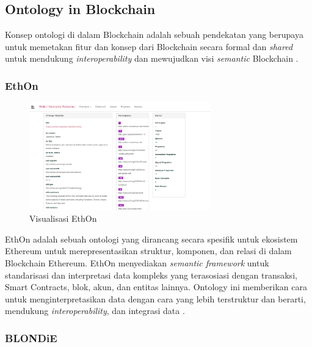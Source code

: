 \subsection{Ontology in Blockchain}
\label{subsec:ontology-in-blockchain}

Konsep ontologi di dalam Blockchain adalah sebuah pendekatan yang berupaya untuk memetakan fitur dan konsep dari Blockchain secara formal dan \textit{shared} untuk mendukung \textit{interoperability} \parencite{9770809} dan mewujudkan visi \textit{semantic} Blockchain \parencite{hector2020blondie}. 

\subsubsection{EthOn}
\label{subsubsec:ethon}

\begin{figure}[ht]
  \centering
  \includegraphics[width=0.7\textwidth]{resources/chapter-2/ethon.png}
  \caption{Visualisasi EthOn \parencite{ethon2024}}
  \label{image:ethon}
\end{figure}

EthOn adalah sebuah ontologi yang dirancang secara spesifik untuk ekosistem Ethereum untuk merepresentasikan struktur, komponen, dan relasi di dalam Blockchain Ethereum. EthOn menyediakan \textit{semantic framework} untuk standarisasi dan interpretasi data kompleks yang terasosiasi dengan transaksi, Smart Contracts, blok, akun, dan entitas lainnya. Ontology ini memberikan cara untuk menginterpretasikan data dengan cara yang lebih terstruktur dan berarti, mendukung \textit{interoperability}, dan integrasi data \parencite{pfeffer2016ethon}.

\subsubsection{BLONDiE}
\label{subsubsec:blondie}

